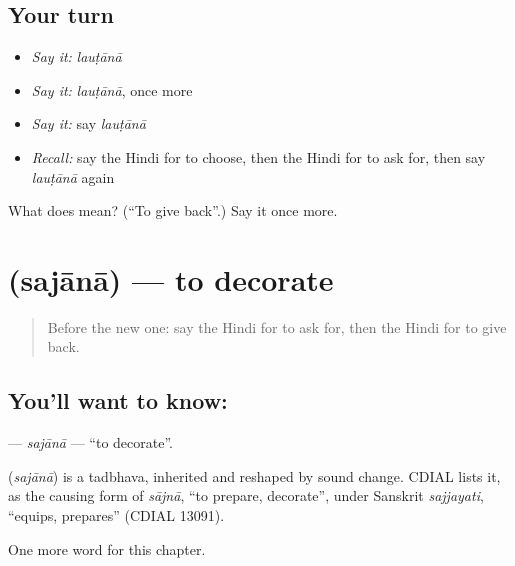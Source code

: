 \subsection*{Your turn}
\begin{itemize}
\raggedright
  \item \emph{Say it:} \emph{lauṭānā}
  \item \emph{Say it:} \emph{lauṭānā}, once more
  \item \emph{Say it:} say \emph{lauṭānā}
  \item \emph{Recall:} say the Hindi for to choose, then the Hindi for to ask for, then say \emph{lauṭānā} again
\end{itemize}

\begin{tcolorbox}[breakable,colback=teal!4,colframe=teal!35!black,title={Before you move on}]
What does  mean? (\textquotedblleft{}To give back\textquotedblright{}.) Say it once more.
\end{tcolorbox}
\section[\texorpdfstring{\hi{सजाना} (sajānā)}{सजाना (sajānā)}]{ (sajānā) — to decorate}

\label{lesson:HI-C174-sajana}



\begin{quote}
Before the new one: say the Hindi for to ask for, then the Hindi for to give back.
\end{quote}

\subsection*{You'll want to know: }
\textbf{} — \emph{sajānā} — \textquotedblleft{}to decorate\textquotedblright{}.

\begin{cousinweb}
\textbf{} (\emph{sajānā}) is a tadbhava, inherited and reshaped by sound change. CDIAL lists it, as the causing form of \emph{sājnā}, \textquotedblleft{}to prepare, decorate\textquotedblright{}, under Sanskrit \emph{sajjayati}, \textquotedblleft{}equips, prepares\textquotedblright{} (CDIAL 13091).
\end{cousinweb}

\begin{grammarlens}[title={What you've built}]
One more word for this chapter.
\end{grammarlens}

